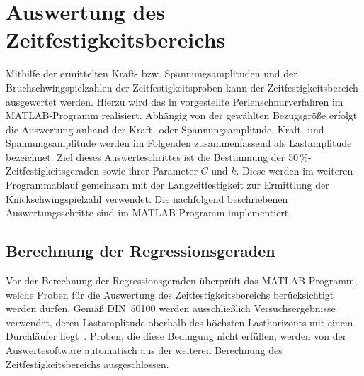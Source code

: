 	\section{Auswertung des Zeitfestigkeitsbereichs}
	Mithilfe der ermittelten Kraft- bzw. Spannungsamplituden und der Bruchschwingspielzahlen der Zeitfestigkeitsproben kann der Zeitfestigkeitsbereich ausgewertet werden. Hierzu wird das in  vorgestellte Perlenschnurverfahren im MATLAB-Programm realisiert. Abhängig von der gewählten Bezugsgröße erfolgt die Auswertung anhand der Kraft- oder Spannungsamplitude. Kraft- und Spannungsamplitude werden im Folgenden zusammenfassend als Lastamplitude bezeichnet.
	Ziel dieses Auswerteschrittes ist die Bestimmung der 50\,\%-Zeitfestigkeitsgeraden sowie ihrer Parameter $C$ und $k$. Diese werden im weiteren Programmablauf gemeinsam mit der Langzeitfestigkeit zur Ermittlung der Knickschwingspielzahl verwendet.
	Die nachfolgend beschriebenen Auswertungsschritte sind im MATLAB-Programm implementiert.
	
	\subsection{Berechnung der Regressionsgeraden}
	Vor der Berechnung der Regressionsgeraden überprüft das MATLAB-Programm, 
welche Proben für die Auswertung des Zeitfestigkeitsbereichs berücksichtigt 
werden dürfen. Gemäß DIN~50100 werden ausschließlich Versuchsergebnisse 
verwendet, deren Lastamplitude oberhalb des höchsten Lasthorizonts mit einem 
Durchläufer liegt~\cite[Seite~54]{DIN50100}. Proben, die diese Bedingung nicht 
erfüllen, werden von der Auswertesoftware automatisch aus der weiteren 
Berechnung des Zeitfestigkeitsbereichs ausgeschlossen.
	
